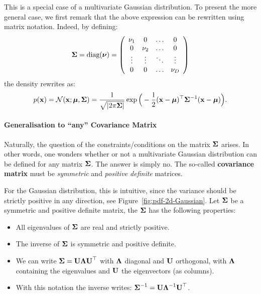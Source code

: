 This is a special case of a multivariate Gaussian distribution. To present the more general case, we first remark that the above expression can be rewritten using matrix notation. Indeed, by defining:
\begin{equation}
    \boldsymbol{\mathbf{\Sigma}}=\textrm{diag}(\boldsymbol{\nu})=\left(\begin{array}{cccc}
    \nu_1 & 0 & \ldots & 0 \\
    0 & \nu_2 & \ldots & 0 \\
    \vdots & \vdots & \ddots & \vdots \\
    0 & 0 & \ldots & \nu_D
    \end{array}\right)
\end{equation}
the density rewrites as:
\begin{equation}
    p(\mathbf{x}) = \mathcal{N}(\mathbf{x};\boldsymbol{\mathbf{\mu}},\boldsymbol{\mathbf{\Sigma}}) = \frac{1}{\sqrt{|2\pi\boldsymbol{\mathbf{\Sigma}}|}}\exp\Big(-\frac{1}{2}(\boldsymbol{\mathbf{x}}-\boldsymbol{\mathbf{\mu}})^\top\boldsymbol{\mathbf{\Sigma}}^{-1}(\boldsymbol{\mathbf{x}}-\boldsymbol{\mathbf{\mu}})\Big).
\end{equation}
 
\paragraph{Generalisation to ``any'' Covariance Matrix} Naturally, the question of the constraints/conditions on the matrix $\boldsymbol{\mathbf{\Sigma}}$ arises. In other words, one wonders whether or not a multivariate Gaussian distribution can be defined for any matrix $\boldsymbol{\mathbf{\Sigma}}$. The answer is simply no. The so-called \textbf{covariance matrix} must be  \textit{symmetric} and \textit{positive definite} matrices.\vspace{2mm}
 

For the Gaussian distribution, this is intuitive, since the variance should be strictly positive in any direction, see Figure~\ref{fig:pdf-2d-Gaussian}. Let $\boldsymbol{\mathbf{\Sigma}}$ be a symmetric and positive definite matrix, the $\boldsymbol{\mathbf{\Sigma}}$ has the following properties:
\begin{itemize}
    \item All eigenvalues of $\boldsymbol{\mathbf{\Sigma}}$ are real and  strictly positive.
    \item The inverse of $\boldsymbol{\mathbf{\Sigma}}$ is symmetric and positive definite.
    \item We can write $\boldsymbol{\mathbf{\Sigma}}=\boldsymbol{\mathbf{U}}\boldsymbol{\mathbf{\Lambda}}\boldsymbol{\mathbf{U}}^\top$ with $\boldsymbol{\mathbf{\Lambda}}$ diagonal and $\boldsymbol{\mathbf{U}}$ orthogonal, with $\boldsymbol{\mathbf{\Lambda}}$ containing the eigenvalues and $\boldsymbol{\mathbf{U}}$ the eigenvectors (as columns).
    \item With this notation the inverse writes: $\boldsymbol{\mathbf{\Sigma}}^{-1} = \boldsymbol{\mathbf{U}}\boldsymbol{\mathbf{\Lambda}}^{-1}\boldsymbol{\mathbf{U}}^\top$.
\end{itemize}

